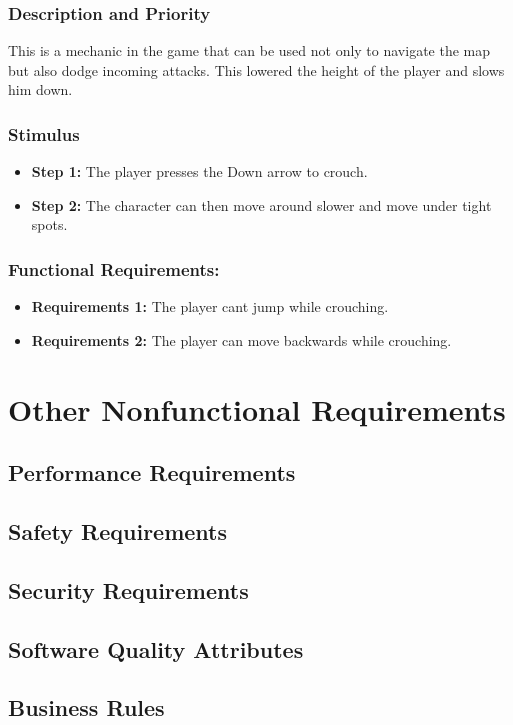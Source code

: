\subsection{Description and Priority}
This is a mechanic in the game that can be used not only to navigate the map but also dodge incoming attacks. This lowered the height of the player and slows him down.
\subsection{Stimulus}
\begin{itemize}
    \item \textbf{Step 1:} The player presses the Down arrow to crouch.
    \item \textbf{Step 2:} The character can then move around slower and move under tight spots. 
\end{itemize}
\subsection{Functional Requirements:}
\begin{itemize}
    \item \textbf{Requirements 1:} The player cant jump while crouching.
    \item \textbf{Requirements 2:} The player can move backwards while crouching.
\end{itemize}
\chapter{Other Nonfunctional Requirements}
\label{Other Nonfunctional Requirements}

\section{Performance Requirements}
\section{Safety Requirements}
\section{Security Requirements}
\section{Software Quality Attributes}
\section{Business Rules}

